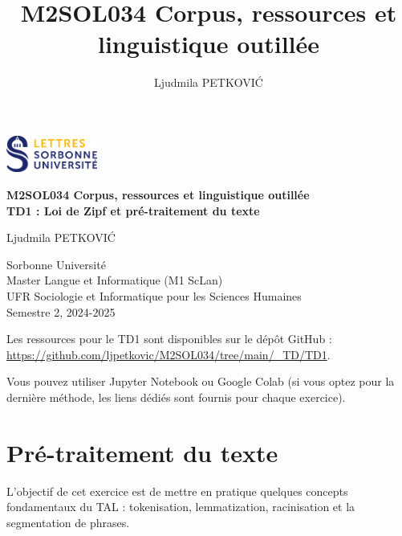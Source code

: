 \documentclass[xcolor={table,usenames,dvipsnames}]{article}
\author{Ljudmila PETKOVI\'C}
\title{\textbf{\textsc{M2SOL034} Corpus, ressources et linguistique outillée}}
\begin{document}
	
	\begin{center}
		\includegraphics[width=3cm]{img/logo.png} %
	\end{center}
	
	\begin{tcolorbox}[colback=myblue!10, colframe=myblue, width=\textwidth, sharp corners, boxrule=1pt]
		\centering
		\Large \textbf{\textsc{M2SOL034} Corpus, ressources et linguistique outillée\\{\large\textsc{TD1} : Loi de Zipf et pré-traitement du texte}}
	\end{tcolorbox}
	
	\begin{center}
		Ljudmila PETKOVI\'C
		
		{\small Sorbonne Université\\Master \og{}Langue et Informatique\fg{} (\textsc{M1} ScLan)\\\textsc{UFR} Sociologie et Informatique pour les Sciences Humaines\\Semestre 2, 2024-2025}
	\end{center}
	


		
	\tableofcontents
	
	\bigskip
	Les ressources pour le \textsc{TD1} sont disponibles sur le dépôt GitHub :\\ \url{https://github.com/ljpetkovic/M2SOL034/tree/main/\_TD/TD1}. 
	
	Vous pouvez utiliser Jupyter Notebook ou Google Colab (si vous optez pour la dernière méthode, les liens dédiés sont fournis pour chaque exercice).
	
	\section{Pré-traitement du texte}  %
	L'objectif de cet exercice est de mettre en pratique quelques concepts fondamentaux du \textsc{TAL} : tokenisation, lemmatization, racinisation et la segmentation de phrases.
	
\end{document}

